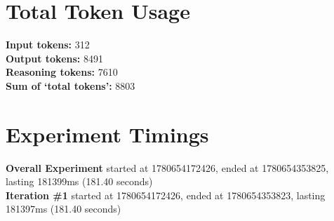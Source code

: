 \documentclass{article}
\begin{document}
\section*{Total Token Usage}
\textbf{Input tokens: }312
\\\textbf{Output tokens: }8491
\\\textbf{Reasoning tokens: }7610
\\\textbf{Sum of `total tokens': }8803
\section*{Experiment Timings}
\textbf{Overall Experiment} started at 1780654172426, ended at 1780654353825, lasting 181399ms (181.40 seconds)
\\\textbf{Iteration \#1} started at 1780654172426, ended at 1780654353823, lasting 181397ms (181.40 seconds)
\end{document}

